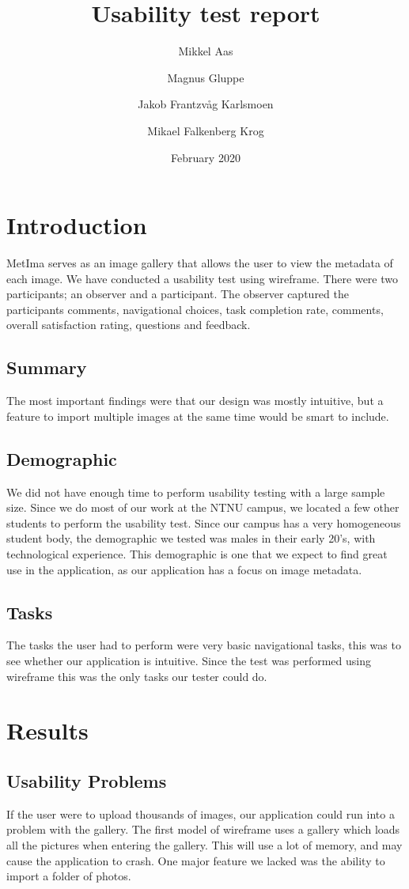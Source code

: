 \documentclass{article}
\title{Usability test report}
\author{Mikkel Aas \and Magnus Gluppe \and Jakob Frantzvåg Karlsmoen \and Mikael Falkenberg Krog}
\date{February 2020}
\begin{document}
\maketitle

\section{Introduction}
MetIma serves as an image gallery that allows the user to view the metadata of each image. We have conducted a usability test using wireframe. There were two participants; an observer and a participant. The observer captured the participants comments, navigational choices, task completion rate, comments, overall satisfaction rating, questions and feedback.

\subsection{Summary}
The most important findings were that our design was mostly intuitive, but a feature to import multiple images at the same time would be smart to include.

\subsection{Demographic}
We did not have enough time to perform usability testing with a large sample size. Since we do most of our work at the NTNU campus, we located a few other students to perform the usability test. Since our campus has a very homogeneous student body, the demographic we tested was males in their early 20's, with technological experience. This demographic is one that we expect to find great use in the application, as our application has a focus on image metadata.   

\subsection{Tasks}
The tasks the user had to perform were very basic navigational tasks, this was to see whether our application is intuitive. Since the test was performed using wireframe this was the only tasks our tester could do.
\section{Results}

\subsection{Usability Problems}
If the user were to upload thousands of images, our application could run into a problem with the gallery. The first model of wireframe uses a gallery which loads all the pictures when entering the gallery. This will use a lot of memory, and may cause the application to crash.
One major feature we lacked was the ability to import a folder of photos.
\end{document}
